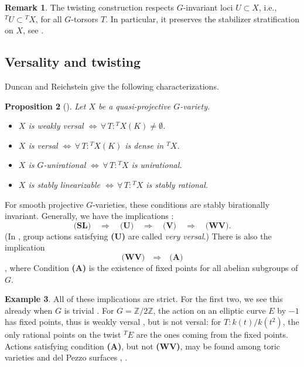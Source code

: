 \documentclass[12pt, reqno]{amsart}
\numberwithin{equation}{section}
\theoremstyle{plain}
\newtheorem{prop}{Proposition}[section]
\theoremstyle{definition}
\newtheorem{exam}[prop]{Example}
\newtheorem{rema}[prop]{Remark}
\def\bZ{{\mathbb Z}}
\begin{document}
\begin{rema}
    \label{rema:twist-stab}
The twisting construction respects $G$-invariant loci $U\subset X$, i.e.,
${}^TU\subset {}^TX$, for all $G$-torsors $T$. In particular, it preserves the stabilizer stratification on $X$, see \cite[Sect.\ 6.1]{KTsurvey}.
\end{rema}









\subsection*{Versality and twisting}



Duncan and Reichstein give the following characterizations.

\begin{prop}[{\cite{DR}}]
\label{prop.DR}
Let $X$ be a quasi-projective $G$-variety.
\begin{itemize}
\item[(i)] $X$ is weakly versal $\Leftrightarrow\,\forall\,T\colon{}^TX(K)\ne \emptyset$.
\item[(ii)] $X$ is versal $\Leftrightarrow\,\forall\,T\colon{}^TX(K)$ is dense in ${}^TX$.
\item[(iii)] $X$ is $G$-unirational $\Leftrightarrow\,\forall\,T\colon{}^TX$ is unirational.
\item[(iv)] $X$ is stably linearizable $\Leftrightarrow\,\forall\,T\colon{}^TX$ is stably rational.
\end{itemize}
\end{prop}

For smooth projective $G$-varieties, these conditions are stably birationally invariant.
Generally, we have the implications \cite[(1.1)]{DR}:
\[ \textbf{(SL)}\quad\Rightarrow\quad \textbf{(U)}\quad\Rightarrow\quad \textbf{(V)}\quad\Rightarrow\quad \textbf{(WV)}. \]
(In \cite{DR}, group actions satisfying \textbf{(U)} are called \emph{very versal}.) 
There is also the implication
\[ \textbf{(WV)}\quad\Rightarrow\quad \textbf{(A)} \]
\cite[Rmk.\ 2.7]{DR},
where Condition \textbf{(A)} is the existence of fixed points for all abelian subgroups of $G$.

\begin{exam}
\label{exa.WVV}
All of these implications are strict.
For the first two, we see this already when
$G$ is trivial \cite[Sect.\ 1]{DR}.
For $G=\bZ/2\bZ$, the action on an elliptic curve $E$ by $-1$ has fixed points, thus is weakly versal \cite[Prop.\ 2.2]{DR}, but is not versal:
for $T\colon k(t)/k(t^2)$, the only rational points on the twist ${}^TE$ are the ones coming from the fixed points.
Actions satisfying condition \textbf{(A)}, but not \textbf{(WV)}, may be found among toric varieties and del Pezzo surfaces \cite{KT-uni}, \cite{STZ}.
\end{exam}
\end{document}
